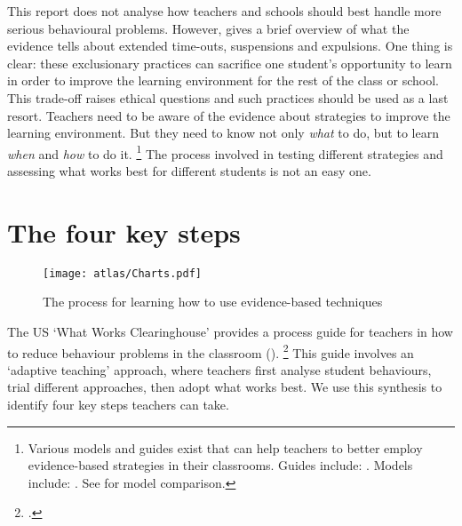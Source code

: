 \documentclass{grattan}
\begin{document}
This report does not analyse how teachers and schools should best handle more serious behavioural problems. However,  gives a brief overview of what the evidence tells about extended time-outs, suspensions and expulsions. One thing is clear: these exclusionary practices can sacrifice one student's opportunity to learn in order to improve the learning environment for the rest of the class or school. This trade-off raises ethical questions and such practices should be used as a last resort.
\clearpage
{}\label{sec:part-b-how-to-implement}
\vspace*{0.5\baselineskip}
Teachers need to be aware of the evidence about strategies to improve the learning environment. But they need to know not only \emph{what} to do, but to learn \emph{when} and \emph{how} to do it.%
    \footnote{Various models and guides exist that can help teachers to better employ evidence-based strategies in their classrooms. Guides include: \textcites{Epstein2008ReducingBehaviorProblems}{Greenberg2014TrainingOurFuture}{Marzano2003ClassroomManagementWorks}. Models include: \textcites{Alberto2012AppliedBehaviorAnalysis}{Evertson1995ClassroomOrganizationManagement}{PBIS2017PositiveBehavioralInterventionsSupports}{Rogers2015ClassroomBehaviourPractical}. See \textcites{EvertsonWeinstein2013HandbookClassroomManagement}{ONeillStephenson2014EvidenceBasedClassroom} for model comparison.}
The process involved in testing different strategies and assessing what works best for different students is not an easy one.
\section{The four key steps}\label{sec:four-key-steps}

\begin{figure}
\caption{The process for learning how to use evidence-based techniques\label{fig:what-teachers-can-do}}
\texttt{[image: atlas/Charts.pdf]}
\end{figure}

The US `What Works Clearinghouse' provides a process guide for teachers in how to reduce behaviour problems in the classroom ().%
    \footcite{Epstein2008ReducingBehaviorProblems}
This guide involves an `adaptive teaching' approach, where teachers first analyse student behaviours, trial different approaches, then adopt what works best. We use this synthesis to identify four key steps teachers can take.
\end{document}

